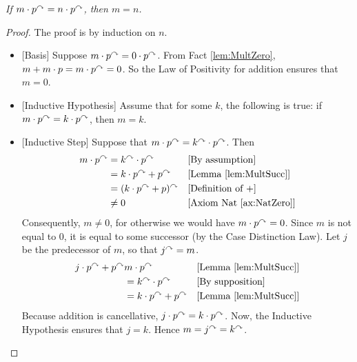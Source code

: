 \begin{fact}

  \emph{If $m\cdot p^\curvearrowright = n\cdot p^\curvearrowright$, then $m=n$.}

\begin{proof}
  The proof is by induction on $n$.
  \begin{itemize}
  \item{}[Basis] Suppose $m\cdot p^\curvearrowright = 0\cdot p^\curvearrowright$. From Fact
    \ref{lem:MultZero}, $m+ m\cdot p = m\cdot p^\curvearrowright = 0$. So the Law of
    Positivity for addition ensures that $m=0$.
  \item{}[Inductive Hypothesis] Assume that for some $k$, the following is true:
    if $m\cdot p^\curvearrowright = k\cdot p^\curvearrowright$, then $m=k$.
  \item{}[Inductive Step] Suppose that $m\cdot p^\curvearrowright = k^\curvearrowright \cdot
    p^\curvearrowright$. Then
    \begin{align*}
      m\cdot p^\curvearrowright &= k^\curvearrowright\cdot p^\curvearrowright &&\text{[By assumption]}\\
      &= k\cdot p^\curvearrowright + p^\curvearrowright &&\text{[Lemma \ref{lem:MultSucc}]}\\
      &= (k\cdot p^\curvearrowright + p)^\curvearrowright &&\text{[Definition of $+$]}\\
      &\neq 0 &&\text{[Axiom Nat \ref{ax:NatZero}]}
    \end{align*}
    Consequently, $m\neq 0$, for otherwise we would have $m\cdot
    p^\curvearrowright = 0$. Since $m$ is not equal to $0$, it is equal to some
    successor (by the Case Distinction Law). Let $j$ be the predecessor of $m$,
	so that $j^\curvearrowright=m$.
    \begin{align*}
      j\cdot p^\curvearrowright + p^\curvearrowright & m\cdot p^\curvearrowright &&\text{[Lemma \ref{lem:MultSucc}]}\\
      &= k^\curvearrowright \cdot p^\curvearrowright &&\text{[By supposition]}\\
      &= k\cdot p^\curvearrowright + p^\curvearrowright &&\text{[Lemma \ref{lem:MultSucc}]}
    \end{align*}
    Because addition is cancellative, $j\cdot p^\curvearrowright = k\cdot
    p^\curvearrowright$. Now, the Inductive Hypothesis ensures that $j=k$. Hence
    $m = j^\curvearrowright = k^\curvearrowright$.
  \end{itemize}
\end{proof}
\end{fact}

